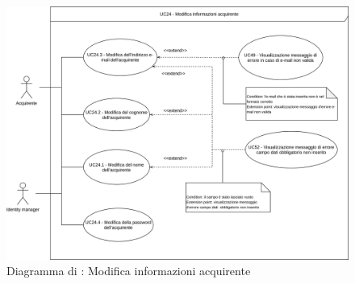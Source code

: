 
\label{modifica-informazioni-acquirente}

\begin{figure}[H]
    \centering
    \includegraphics[scale=0.6]{Immagini/DiagrammiUC/Acquirente/ModificaInformazioniAcquirente.png}
    \caption{Diagramma di \actualUC: Modifica informazioni acquirente}
    \label{fig:modifica-informazioni-acquirente}
\end{figure}

